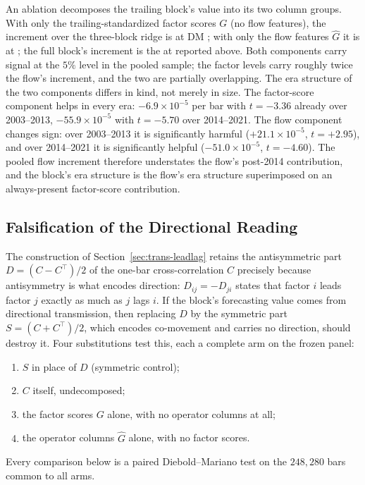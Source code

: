 An ablation decomposes the trailing block's value into its two column
groups. With only the trailing-standardized factor scores $G$ (no flow
features), the increment over the three-block ridge is
\unifIncrBlkFourTrailGDQ{} at DM \unifIncrBlkFourTrailGDM{}; with only
the flow features $\hat G$ it is \unifIncrBlkFourTrailGhatDQ{} at
\unifIncrBlkFourTrailGhatDM{}; the full block's increment is the
\unifIncrBlkFourTrailDQ{} at \unifIncrBlkFourTrailDM{} reported above.
Both components carry signal at the $5\%$ level in the pooled sample;
the factor levels carry roughly twice the flow's increment, and the two
are partially overlapping. The era structure of the two components
differs in kind, not merely in size. The factor-score component helps in
every era: $-6.9 \times 10^{-5}$ per bar with $t = -3.36$ already over
2003--2013, $-55.9 \times 10^{-5}$ with $t = -5.70$ over 2014--2021.
The flow component changes sign: over 2003--2013 it is significantly
harmful ($+21.1 \times 10^{-5}$, $t = +2.95$), and over 2014--2021 it is
significantly helpful ($-51.0 \times 10^{-5}$, $t = -4.60$). The pooled
flow increment therefore understates the flow's post-2014 contribution,
and the block's era structure is the flow's era structure superimposed
on an always-present factor-score contribution.

\subsection{Falsification of the Directional Reading}
\label{sec:trans_falsification}

The construction of Section~\ref{sec:trans-leadlag} retains the
antisymmetric part $D = (C - C^{\top})/2$ of the one-bar cross-correlation
$C$ precisely because antisymmetry is what encodes direction: $D_{ij} =
-D_{ji}$ states that factor $i$ leads factor $j$ exactly as much as $j$
lags $i$. If the block's forecasting value comes from directional
transmission, then replacing $D$ by the symmetric part $S = (C +
C^{\top})/2$, which encodes co-movement and carries no direction, should
destroy it. Four substitutions test this, each a complete arm on the
frozen panel:
\begin{enumerate}
\item $S$ in place of $D$ (symmetric control);
\item $C$ itself, undecomposed;
\item the factor scores $G$ alone, with no operator columns at all;
\item the operator columns $\hat G$ alone, with no factor scores.
\end{enumerate}
Every comparison below is a paired Diebold--Mariano test on the
$248{,}280$ bars common to all arms.


